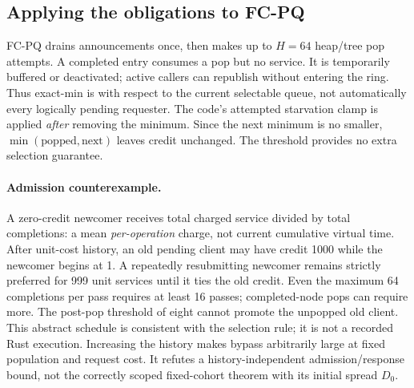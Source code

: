 \subsection{Applying the obligations to FC-PQ}
FC-PQ drains announcements once, then makes up to $H=64$ heap/tree pop
attempts. A completed entry consumes a pop but no service. It is temporarily
buffered or deactivated; active callers can republish without entering the
ring. Thus exact-min is with respect to the current selectable queue, not
automatically every logically pending requester. The code's attempted
starvation clamp is applied \emph{after} removing the minimum. Since the next
minimum is no smaller, $\min(\text{popped},\text{next})$ leaves credit unchanged.
The threshold provides no extra selection guarantee.

\paragraph{Admission counterexample.}
A zero-credit newcomer receives total charged service divided by total
completions: a mean \emph{per-operation} charge, not current cumulative virtual
time. After unit-cost history, an old pending client may have credit 1000
while the newcomer begins at 1. A repeatedly resubmitting newcomer remains
strictly preferred for 999 unit services until it ties the old credit.
Even the maximum 64 completions per pass requires at least 16 passes;
completed-node pops can require more. The post-pop threshold of eight cannot
promote the unpopped old client. This abstract schedule is consistent with
the selection rule; it is not a recorded Rust execution. Increasing the
history makes bypass arbitrarily large at fixed population and request cost.
It refutes a history-independent admission/response bound, not the correctly
scoped fixed-cohort theorem with its initial spread $D_0$.

